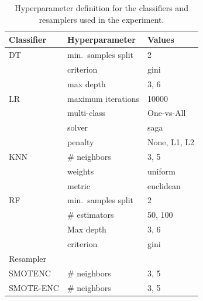 \begin{table}[ht]
	\centering
    \caption{\label{tbl:grid}
        Hyperparameter definition for the classifiers and resamplers used in
        the experiment.
    }
	\begin{tabular}{lll}
		\toprule
		Classifier      & Hyperparameter                   & Values                         \\
		\midrule
        DT              & min.\ samples split              & 2                              \\
                        & criterion                        & gini                           \\
                        & max depth                        & 3, 6                           \\
		LR              & maximum iterations               & 10000                          \\
                        & multi-class                      & One-vs-All                     \\
		                & solver                           & saga                           \\
                        & penalty                          & None, L1, L2                   \\
		KNN             & \# neighbors                     & 3, 5                           \\
                        & weights                          & uniform                        \\
                        & metric                           & euclidean                      \\
		RF              & min.\ samples split              & 2                              \\
		                & \# estimators                    & 50, 100                        \\
		                & Max depth                        & 3, 6                           \\
                        & criterion                        & gini                           \\
		\toprule
		Resampler       &                                  &                                \\
		\midrule
		SMOTENC         & \# neighbors                     & 3, 5                           \\
		SMOTE-ENC       & \# neighbors                     & 3, 5                           \\

\end{tabular}
\end{table}
